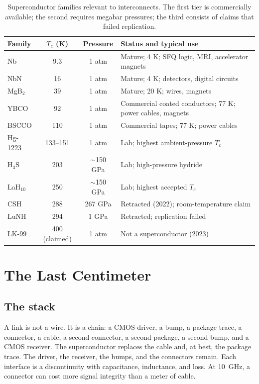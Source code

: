 \documentclass[10pt,letterpaper]{article}
\begin{document}
\begin{table}[t]
\centering
\caption{Superconductor families relevant to interconnects. The first tier is commercially available; the second requires megabar pressures; the third consists of claims that failed replication.}
\label{tab:materials}
\small
\begin{tabularx}{\linewidth}{@{}lccX@{}}
\toprule
Family & $T_c$ (K) & Pressure & Status and typical use \\
\midrule
Nb & 9.3 & 1 atm & Mature; 4 K; SFQ logic, MRI, accelerator magnets \\
NbN & 16 & 1 atm & Mature; 4 K; detectors, digital circuits \\
MgB$_2$ & 39 & 1 atm & Mature; 20 K; wires, magnets \\
YBCO & 92 & 1 atm & Commercial coated conductors; 77 K; power cables, magnets \\
BSCCO & 110 & 1 atm & Commercial tapes; 77 K; power cables \\
Hg-1223 & 133--151 & 1 atm & Lab; highest ambient-pressure $T_c$ \\
H$_3$S & 203 & $\sim$150 GPa & Lab; high-pressure hydride \\
LaH$_{10}$ & 250 & $\sim$150 GPa & Lab; highest accepted $T_c$ \\
CSH & 288 & 267 GPa & Retracted (2022); room-temperature claim \\
LuNH & 294 & 1 GPa & Retracted; replication failed \\
LK-99 & 400 (claimed) & 1 atm & Not a superconductor (2023) \\
\bottomrule
\end{tabularx}
\end{table}

\section{The Last Centimeter}
\label{sec:lastcm}

\subsection{The stack}

A link is not a wire. It is a chain: a CMOS driver, a bump, a package trace, a connector, a cable, a second connector, a second package, a second bump, and a CMOS receiver. The superconductor replaces the cable and, at best, the package trace. The driver, the receiver, the bumps, and the connectors remain. Each interface is a discontinuity with capacitance, inductance, and loss. At 10~GHz, a connector can cost more signal integrity than a meter of cable.
\end{document}
